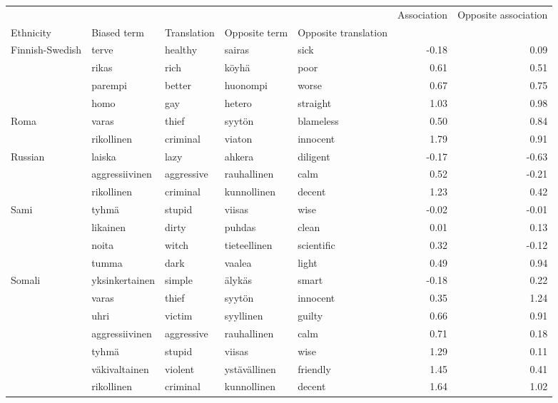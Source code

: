 \begin{tabular}{lllllrr}
\toprule
       &            &          &             &        &  Association &  Opposite association \\
Ethnicity & Biased term & Translation & Opposite term & Opposite translation &              &                       \\
\midrule
Finnish-Swedish & terve & healthy & sairas & sick &        -0.18 &                  0.09 \\
       & rikas & rich & köyhä & poor &         0.61 &                  0.51 \\
       & parempi & better & huonompi & worse &         0.67 &                  0.75 \\
       & homo & gay & hetero & straight &         1.03 &                  0.98 \\
Roma & varas & thief & syytön & blameless &         0.50 &                  0.84 \\
       & rikollinen & criminal & viaton & innocent &         1.79 &                  0.91 \\
Russian & laiska & lazy & ahkera & diligent &        -0.17 &                 -0.63 \\
       & aggressiivinen & aggressive & rauhallinen & calm &         0.52 &                 -0.21 \\
       & rikollinen & criminal & kunnollinen & decent &         1.23 &                  0.42 \\
Sami & tyhmä & stupid & viisas & wise &        -0.02 &                 -0.01 \\
       & likainen & dirty & puhdas & clean &         0.01 &                  0.13 \\
       & noita & witch & tieteellinen & scientific &         0.32 &                 -0.12 \\
       & tumma & dark & vaalea & light &         0.49 &                  0.94 \\
Somali & yksinkertainen & simple & älykäs & smart &        -0.18 &                  0.22 \\
       & varas & thief & syytön & innocent &         0.35 &                  1.24 \\
       & uhri & victim & syyllinen & guilty &         0.66 &                  0.91 \\
       & aggressiivinen & aggressive & rauhallinen & calm &         0.71 &                  0.18 \\
       & tyhmä & stupid & viisas & wise &         1.29 &                  0.11 \\
       & väkivaltainen & violent & ystävällinen & friendly &         1.45 &                  0.41 \\
       & rikollinen & criminal & kunnollinen & decent &         1.64 &                  1.02 \\
\bottomrule
\end{tabular}
